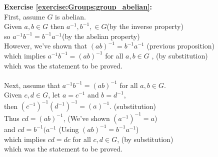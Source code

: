\noindent\textbf{Exercise \ref{exercise:Groups:group_abelian}:}
\\
First, assume $G$ is abelian.\\
Given $a,b \in G$ then $a^{-1},b^{-1}, \in G$\quad (by the inverse property)\\
so $a^{-1}b^{-1} = b^{-1}a^{-1}$\quad (by the abelian property)\\
However, we've shown that $(ab)^{-1} = b^{-1}a^{-1}$ \quad (previous proposition)\\
which implies $a^{-1}b^{-1} = (ab)^{-1}$ for all $a,b \in G$ , \quad (by substitution)\\
which was the statement to be proved.\\
\\
Next, assume that $a^{-1}b^{-1} = (ab)^{-1}$ for all $a,b \in G$.\\
Given $c,d \in G$, let $a=c^{-1}$ and $b=d^{-1}$,\\
then $(c^{-1})^{-1}(d^{-1})^{-1} = (a)^{-1}$. \quad (substitution)\\
Thus $cd = (ab)^{-1}$, \quad (We've shown $(a^{-1})^{-1} = a$)\\
and $cd = b^{-1}(a^{-1}$ \quad (Using $(ab)^{-1} = b^{-1}a^{-1}$)\\
which implies $cd = dc$ for all $c,d \in G$, \quad (by substitution)\\
which was the statement to be proved.
\\

